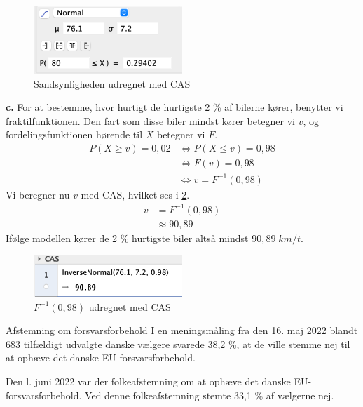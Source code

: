 \documentclass{article}
\begin{document}
\begin{figure}[H]
\begin{center}
  \includegraphics[width=0.5\textwidth]{CASgeq80.png}
\end{center}
\caption{Sandsynligheden udregnet med CAS}
\label{fig:CASgeq80}
\end{figure}
\noindent \textbf{c.}
For at bestemme, hvor hurtigt de hurtigste 2 \% af bilerne kører, benytter vi fraktilfunktionen.
Den fart som disse biler mindst kører betegner vi $v$, og fordelingsfunktionen hørende til $X$ betegner vi $F$.
\begin{equation*}
\begin{split}
  P(X \geq v) = 0,02 &\iff P(X \leq v) = 0,98 \\
  &\iff F(v)=0,98 \\
  &\iff v=F ^{-1}(0,98)
\end{split}
\end{equation*}
Vi beregner nu $v$ med CAS, hvilket ses i \cref{fig:CAShurtigst}. 
\begin{equation*}
\begin{split}
  v&=F ^{-1}(0,98)\\
  &\approx 90,89
\end{split}
\end{equation*}
Ifølge modellen kører de 2 \% hurtigste biler altså mindst $90,89 \;\unit{km/t} $.
\begin{figure}[H]
\begin{center}
  \includegraphics[width=0.5\textwidth]{CAShurtigst.png}
\end{center}
  \caption{$F ^{-1}(0,98)$ udregnet med CAS }
\label{fig:CAShurtigst}
\end{figure}
\begin{question}{Afstemning om forsvarsforbehold}{}
I en meningsmåling fra den 16. maj 2022 blandt 683 tilfældigt udvalgte danske vælgere svarede 38,2 \%, at de ville stemme nej til at ophæve det danske EU-forsvarsforbehold.

Den l. juni 2022 var der folkeafstemning om at ophæve det danske EU-forsvarsforbehold.
Ved denne folkeafstemning stemte 33,1 \% af vælgerne nej.
\end{question}
\end{document}
